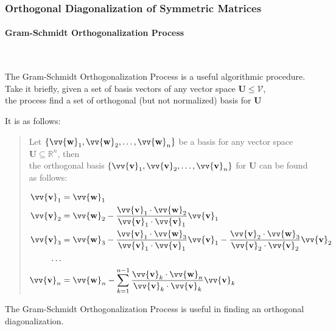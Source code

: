 \documentclass[11pt]{article}
\DeclareRobustCommand{\myvec}[1]{\vv{\mathbf{#1}}}
\newcommand{\myvecsp}[1]{\bm{\mathcal{#1}}}
\newcommand{\mysubvecsp}[1]{\bm{{#1}}}
\newcommand{\dotprod}[2]{#1 \cdot #2}
\begin{document}
    \newpage
    \subsubsection{Orthogonal Diagonalization of Symmetric Matrices}
    \paragraph{Gram-Schmidt Orthogonalization Process}~\vspace{1ex}

    The Gram-Schmidt Orthogonalization Process is a useful algorithmic procedure.
    \\
    Take it briefly, given a set of basis vectors of any vector space $\mysubvecsp{U} \le \myvecsp{V}$,\\
    \quad the process find a set of orthogonal (but not normalized) basis for $\mysubvecsp{U}$ \vspace{1ex}
    
    It is as follows:
    \begin{quote}
        Let $\{\myvec{w}_1, \myvec{w}_2, \dots, \myvec{w}_n\}$ be a basis for any vector space $\mysubvecsp{U} \subseteq \mathbb{R}^n$, then\\
        the orthogonal basis $\{\myvec{v}_1, \myvec{v}_2, \dots, \myvec{v}_n\}$ for $\mysubvecsp{U}$ can be found as follows:
    
        \begin{align*}
            \myvec{v}_1 &= \myvec{w}_1 \\
            \myvec{v}_2 &= \myvec{w}_2 - \frac{\dotprod{\myvec{v}_1}{\myvec{w}_2}}{\dotprod{\myvec{v}_1}{\myvec{v}_1}}\myvec{v}_1 \\
            \myvec{v}_3 &= \myvec{w}_3 - \frac{\dotprod{\myvec{v}_1}{\myvec{w}_3}}{\dotprod{\myvec{v}_1}{\myvec{v}_1}}\myvec{v}_1 - \frac{\dotprod{\myvec{v}_2}{\myvec{w}_3}}{\dotprod{\myvec{v}_2}{\myvec{v}_2}}\myvec{v}_2 \\
            \dots \\
            \myvec{v}_n &= \myvec{w}_n - \sum_{k = 1}^{n-1} \frac{\dotprod{\myvec{v}_k}{\myvec{w}_n}}{\dotprod{\myvec{v}_k}{\myvec{v}_k}}\myvec{v}_k \\
        \end{align*}
    \end{quote}
    The Gram-Schmidt Orthogonalization Process is useful in finding an orthogonal diagonalization.
    
\end{document}
